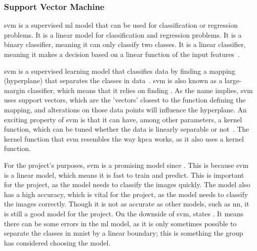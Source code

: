 \subsubsection{Support Vector Machine}\label{subsubsec:support-vector-machine}
\gls{svm} is a supervised \gls{ml} model that can be used for classification or regression problems. It is a linear model for classification and regression problems. It is a binary classifier, meaning it can only classify two classes. It is a linear classifier, meaning it makes a decision based on a linear function of the input features~\cite{james-statistical-learning1}.

\gls{svm} is a supervised learning model that classifies data by finding a mapping (hyperplane) that separates the classes in data~\cite{faster-svm}. \gls{svm} is also known as a large-margin classifier, which means that it relies on finding . As the name implies, \gls{svm} uses support vectors, which are the 'vectors' closest to the function defining the mapping, and alterations on those data points will influence the hyperplane. 
An exciting property of \gls{svm} is that it can have, among other parameters, a kernel function, which can be tuned whether the data is linearly separable or not~\cite{faster-svm}. The kernel function that \gls{svm} resembles the way \gls{kpca} works, as it also uses a kernel function.

For the project's purposes, \gls{svm} is a promising model since . This is because \gls{svm} is a linear model, which means it is fast to train and predict. This is important for the project, as the model needs to classify the images quickly. The model also has a high accuracy, which is vital for the project, as the model needs to classify the images correctly. Though it is not as accurate as other models, such as \gls{nn}, it is still a good model for the project. On the downside of \gls{svm}, \cite{james-statistical-learning1} states . It means there can be some errors in the \gls{ml} model, as it is only sometimes possible to separate the classes in \gls{mnist} by a linear boundary; this is something the group has considered choosing the model. 

